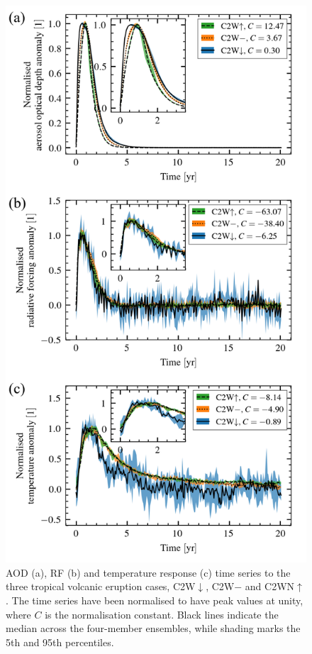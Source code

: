 \documentclass[draft]{agujournal2019}
\newcommand{\cwmp}{C2W\(-\)}
\newcommand{\cwm}{C2W\(\downarrow\)}
\newcommand{\cws}{C2WN\(\uparrow\)}
\begin{document}
\begin{figure}
  \centering
  \includegraphics{figures/figure1.png}

  \caption{AOD (a), RF (b) and temperature response (c) time series to the
    three tropical volcanic eruption cases, \cwm{}, \cwmp{} and \cws{}. The time
    series have been normalised to have peak values at unity, where \(C\) is the
    normalisation constant. Black lines indicate the median across the four-member
    ensembles, while shading marks the 5th and 95th
    percentiles.}\label{fig:compare-waveform-temp}%
\end{figure}
\end{document}
